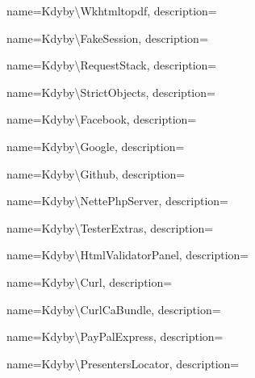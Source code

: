  {
  name={K\-dy\-by\textbackslash{}\-Wk\-html\-to\-pdf},
  description={} }

 {
  name={K\-dy\-by\textbackslash{}\-Fa\-ke\-Ses\-si\-on},
  description={} }

 {
  name={K\-dy\-by\textbackslash{}\-Re\-que\-st\-Sta\-ck},
  description={} }

 {
  name={K\-dy\-by\textbackslash{}\-Stri\-ct\-Ob\-je\-ct\-s},
  description={} }

 {
  name={K\-dy\-by\textbackslash{}\-Fa\-ce\-book},
  description={} }

 {
  name={K\-dy\-by\textbackslash{}\-Google},
  description={} }

 {
  name={K\-dy\-by\textbackslash{}\-Git\-hub},
  description={} }

 {
  name={K\-dy\-by\textbackslash{}\-Nette\-Php\-Ser\-ver},
  description={} }

 {
  name={K\-dy\-by\textbackslash{}\-Tes\-ter\-Ex\-tras},
  description={} }

 {
  name={K\-dy\-by\textbackslash{}\-Html\-Va\-li\-da\-tor\-Pa\-nel},
  description={} }

 {
  name={K\-dy\-by\textbackslash{}\-Curl},
  description={} }

 {
  name={K\-dy\-by\textbackslash{}\-Curl\-Ca\-Bund\-le},
  description={} }

 {
  name={K\-dy\-by\textbackslash{}\-Pay\-Pal\-Ex\-press},
  description={} }

 {
  name={K\-dy\-by\textbackslash{}\-Pre\-sen\-ters\-Lo\-ca\-tor},
  description={} }
